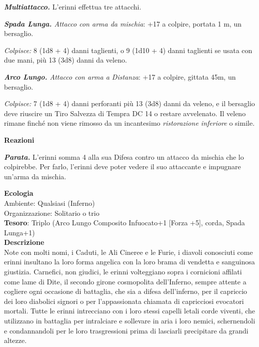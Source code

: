 \begin{multicols}{2}
\textit{\textbf{Multiattacco.}} L'erinni effettua tre attacchi.

\textit{\textbf{Spada Lunga.} Attacco con arma da mischia}: +17 a colpire, portata 1 m, un bersaglio.

\textit{Colpisce:} 8 (1d8 + 4) danni taglienti, o 9 (1d10 + 4) danni taglienti se usata con due mani, più 13 (3d8) danni da veleno.

\textit{\textbf{Arco Lungo.} Attacco con arma a Distanza}: +17 a colpire, gittata 45m, un bersaglio.

\textit{Colpisce:} 7 (1d8 + 4) danni perforanti più 13 (3d8) danni da veleno, e il bersaglio deve riuscire un Tiro Salvezza di Tempra DC 14 o restare avvelenato. Il veleno rimane finché non viene rimosso da un incantesimo \textit{ristorazione inferiore} o simile.

\textbf{Reazioni}

\textit{\textbf{Parata.}} L'erinni somma 4 alla sua Difesa contro un attacco da mischia che lo colpirebbe. Per farlo, l'erinni deve poter vedere il suo attaccante e impugnare un'arma da mischia.

\textbf{Ecologia}\\
Ambiente: Qualsiasi (Inferno)\\
Organizzazione: Solitario o trio\\
\textbf{Tesoro}: Triplo (Arco Lungo Composito Infuocato+1 [Forza +5], corda, Spada Lunga+1)\\
\textbf{Descrizione}\\
Note con molti nomi, i Caduti, le Ali Cineree e le Furie, i diavoli conosciuti come erinni insultano la loro forma angelica con la loro brama di vendetta e sanguinosa giustizia. Carnefici, non giudici, le erinni volteggiano sopra i cornicioni affilati come lame di Dite, il secondo girone cosmopolita dell'Inferno, sempre attente a cogliere ogni occasione di battaglia, che sia a difesa dell'inferno, per il capriccio dei loro diabolici signori o per l'appassionata chiamata di capricciosi evocatori mortali. Tutte le erinni intrecciano con i loro stessi capelli letali corde viventi, che utilizzano in battaglia per intralciare e sollevare in aria i loro nemici, schernendoli e condannandoli per le loro trasgressioni prima di lasciarli precipitare da grandi altezze.


\end{multicols}
